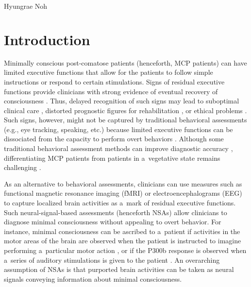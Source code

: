 \begin{artengenv}{Hyungrae Noh}
\section{Introduction}
\lettrine[loversize=0.13,lines=2,lraise=-0.03,nindent=0em,findent=0.2pt]%
{M}{}inimally conscious post-comatose patients (henceforth, MCP patients) can have limited executive functions that allow for the patients to follow simple instructions or respond to certain stimulations. Signs of residual executive functions provide clinicians with strong evidence of eventual recovery of consciousness
\parencites[][]{naccache_minimally_2018}[][]{rohaut_uncovering_2019}. %
 Thus, delayed recognition of such signs may lead to suboptimal clinical care 
\parencite[][]{van_erp_unexpected_2019}, %
 distorted prognostic figures for rehabilitation 
\parencite[][]{ansell_slow--recover_1993}, %
 or ethical problems 
\parencites[][]{peterson_post-comatose_2018}[][]{noh_behavioral_2022}. %
 Such signs, however, might not be captured by traditional behavioral assessments (e.g., eye tracking, speaking, etc.) because limited executive functions can be dissociated from the capacity to perform overt behaviors 
\parencites[][]{teasdale_assessment_1974}[][]{andrews_misdiagnosis_1996}. %
 Although some traditional behavioral assessment methods can improve diagnostic accuracy 
\parencite[][]{schnakers_diagnostic_2009}, %
 differentiating MCP patients from patients in a~vegetative state remains challenging 
\parencite[][]{van_erp_vegetative_2015}.%


As an alternative to behavioral assessments, clinicians can use measures such as functional magnetic resonance imaging (fMRI) or electroencephalograms (EEG) to capture localized brain activities as a~mark of residual executive functions. Such neural-signal-based assessments (henceforth NSAs) allow clinicians to diagnose minimal consciousness without appealing to overt behavior. For instance, minimal consciousness can be ascribed to a~patient if activities in the motor areas of the brain are observed when the patient is instructed to imagine performing a~particular motor action
\parencites[][]{owen_detecting_2006}[][]{cruse_bedside_2011}[][]{wang_detecting_2019}, %
 or if the P300b response is observed when a~series of auditory stimulations is given to the patient 
\parencites[][]{boly_preserved_2011}[][]{king_single-trial_2013}. %
 An overarching assumption of NSAs is that purported brain activities can be taken as neural signals conveying information about minimal consciousness.


\end{artengenv}
